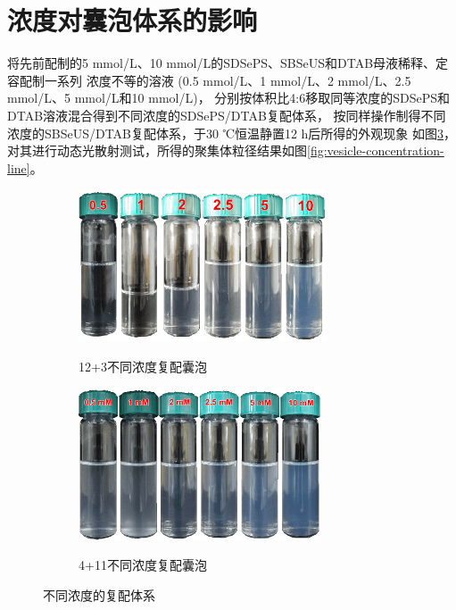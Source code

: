 \documentclass[bachelor,winfonts,replaceperiod]{jnuthesis}
\begin{document}
    \section{浓度对囊泡体系的影响}
    将先前配制的5 mmol/L、10 mmol/L的SDSePS、SBSeUS和DTAB母液稀释、定容配制一系列
    浓度不等的溶液 (0.5 mmol/L、1 mmol/L、2 mmol/L、2.5 mmol/L、5 mmol/L和10 mmol/L)，
    分别按体积比4:6移取同等浓度的SDSePS和DTAB溶液混合得到不同浓度的SDSePS/DTAB复配体系，
    按同样操作制得不同浓度的SBSeUS/DTAB复配体系，于30 ℃恒温静置12 h后所得的外观现象
    如图\ref{fig:不同浓度的复配体系}，对其进行动态光散射测试，所得的聚集体粒径结果如图\ref{fig:vesicle-concentration-line}。
    \begin{figure}[htbp]
        \centering
        \begin{subfigure}[]{\textwidth}
            \centering
            \includegraphics[height=4.5cm]{figure/SDSePS-concentration.png}\\
            \caption{12+3不同浓度复配囊泡}\label{fig:vesicle-SDSePS-concentration}
        \end{subfigure}%
        
        \begin{subfigure}[]{\textwidth}
            \centering
            \includegraphics[height=4.5cm]{figure/SBSeUS-concentration.png}\\
            \caption{4+11不同浓度复配囊泡}\label{fig:vesicle-SBSeUS-concentration}
        \end{subfigure}%
        \caption{不同浓度的复配体系}
        \label{fig:不同浓度的复配体系}
    \end{figure}
    
\end{document}
